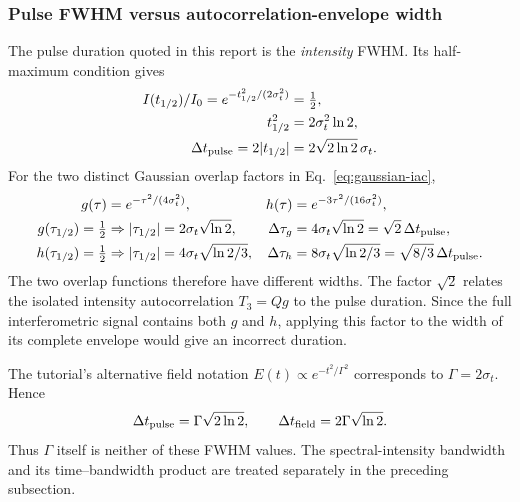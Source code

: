 \subsubsection{Pulse FWHM versus autocorrelation-envelope width}
The pulse duration quoted in this report is the \emph{intensity} FWHM. Its half-maximum condition gives
\begin{align}
I(t_{1/2})/I_0=e^{-t_{1/2}^2/(2\sigma_t^2)}&=\tfrac12,\\
t_{1/2}^2&=2\sigma_t^2\ln2,\\
\Delta t_{\rm pulse}=2|t_{1/2}|&=2\sqrt{2\ln2}\,\sigma_t.
\end{align}
For the two distinct Gaussian overlap factors in Eq.~\eqref{eq:gaussian-iac},
\begin{align}
g(\tau)&=e^{-\tau^2/(4\sigma_t^2)},&
h(\tau)&=e^{-3\tau^2/(16\sigma_t^2)},\\
g(\tau_{1/2})=\tfrac12
&\Rightarrow |\tau_{1/2}|=2\sigma_t\sqrt{\ln2},&
\Delta\tau_g&=4\sigma_t\sqrt{\ln2}
=\sqrt2\,\Delta t_{\rm pulse},\\
h(\tau_{1/2})=\tfrac12
&\Rightarrow |\tau_{1/2}|=4\sigma_t\sqrt{\ln2/3},&
\Delta\tau_h&=8\sigma_t\sqrt{\ln2/3}
=\sqrt{8/3}\,\Delta t_{\rm pulse}.
\end{align}
The two overlap functions therefore have different widths. The factor $\sqrt2$ relates the isolated intensity autocorrelation $T_3=Qg$ to the pulse duration. Since the full interferometric signal contains both $g$ and $h$, applying this factor to the width of its complete envelope would give an incorrect duration.

The tutorial's alternative field notation $E(t)\propto e^{-t^2/\Gamma^2}$ corresponds to $\Gamma=2\sigma_t$. Hence
\begin{equation}
\Delta t_{\rm pulse}=\Gamma\sqrt{2\ln2},
\qquad
\Delta t_{\rm field}=2\Gamma\sqrt{\ln2}.
\end{equation}
Thus $\Gamma$ itself is neither of these FWHM values. The spectral-intensity bandwidth and its time--bandwidth product are treated separately in the preceding subsection.

